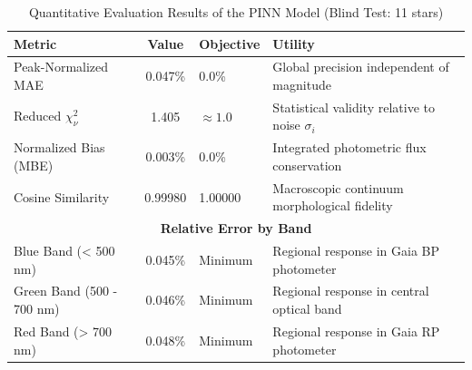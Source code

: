 
\begin{table}[htpb]
\centering
\caption{Quantitative Evaluation Results of the PINN Model (Blind Test: 11 stars)}
\label{tab:pinn_evaluation}
\begin{tabular}{lcll}
\hline
\textbf{Metric} & \textbf{Value} & \textbf{Objective} & \textbf{Utility} \\
\hline
Peak-Normalized MAE & 0.047\% & 0.0\% & Global precision independent of magnitude \\
Reduced $\chi^2_\nu$ & 1.405 & $\approx 1.0$ & Statistical validity relative to noise $\sigma_i$ \\
Normalized Bias (MBE) & 0.003\% & 0.0\% & Integrated photometric flux conservation \\
Cosine Similarity & 0.99980 & 1.00000 & Macroscopic continuum morphological fidelity \\
\hline
\multicolumn{4}{c}{\textbf{Relative Error by Band}} \\
\hline
Blue Band (< 500 nm) & 0.045\% & Minimum & Regional response in Gaia BP photometer \\
Green Band (500 - 700 nm) & 0.046\% & Minimum & Regional response in central optical band \\
Red Band (> 700 nm) & 0.048\% & Minimum & Regional response in Gaia RP photometer \\
\hline
\end{tabular}
\end{table}
